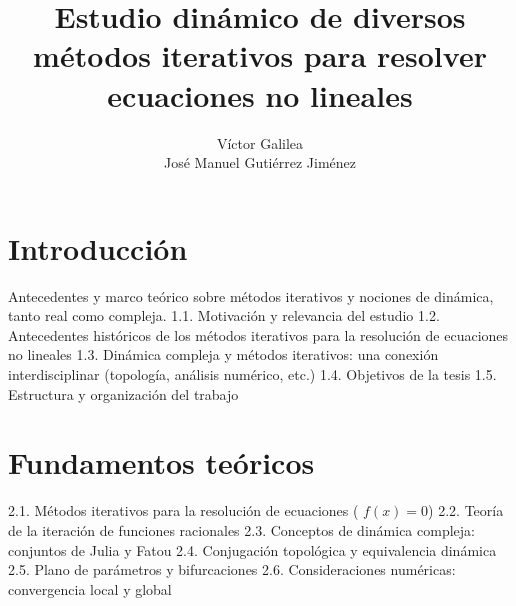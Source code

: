 \documentclass[12pt,a4paper,spanish]{book}
\title{\textbf{Estudio dinámico de diversos métodos iterativos para resolver ecuaciones no lineales}}
\author{Víctor Galilea\\[2ex]
José Manuel Gutiérrez Jiménez\\[2ex]
}
\date{}
\theoremstyle{plain}
\theoremstyle{definition}
\theoremstyle{remark}
\begin{document}
%
%

\frontmatter

\maketitle





\tableofcontents

\mainmatter 


\chapter{Introducción}

Antecedentes y marco teórico sobre métodos iterativos \cite{Traub} y nociones de dinámica, tanto real como compleja. 1.1. Motivación y relevancia del estudio
1.2. Antecedentes históricos de los métodos iterativos para la resolución de ecuaciones no lineales
1.3. Dinámica compleja y métodos iterativos: una conexión interdisciplinar (topología, análisis numérico, etc.)
1.4. Objetivos de la tesis
1.5. Estructura y organización del trabajo


\chapter{Fundamentos teóricos}

2.1. Métodos iterativos para la resolución de ecuaciones ( $f(x) = 0 $)
2.2. Teoría de la iteración de funciones racionales
2.3. Conceptos de dinámica compleja: conjuntos de Julia y Fatou
2.4. Conjugación topológica y equivalencia dinámica
2.5. Plano de parámetros y bifurcaciones
2.6. Consideraciones numéricas: convergencia local y global
\end{document}
